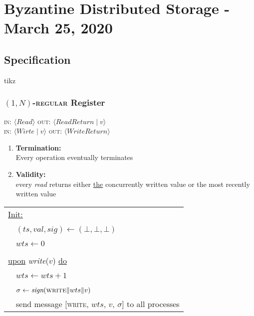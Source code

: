 \documentclass{article}
\begin{document}
	\section{Byzantine Distributed Storage - March 25, 2020}
	\begin{adjustwidth}{2em}{2em}
		\subsection{Specification}
		\begin{adjustwidth}{2em}{2em}
			tikz \\
			\subsubsection{$(1,N)$-\textsc{regular} Register}
			\begin{adjustwidth}{2em}{}
				\textsc{in:} $\langle \textit{Read} \rangle$ \hspace{1.2cm} \textsc{out:} $\langle \textit{ReadReturn} \mid v \rangle$ \\
				\textsc{in:} $\langle \textit{Wirte} \mid v \rangle$ \hspace{1cm}\textsc{out:} $\langle WriteReturn \rangle$ \\
				\begin{enumerate}[-]
					\item \textbf{Termination:} \\
					Every operation eventually terminates
					\item \textbf{Validity:} \\
					every \textit{read} returns either \underline{the} concurrently written value or the most recently written value
				\end{enumerate}
				\begin{center}
					\begin{tabular}{l}
						\underline{Init:} \\
						\ \ $(ts, val, sig) \leftarrow (\bot , \bot , \bot)$ \\
						\ \ $wts \leftarrow 0$ \\
						\\
						\underline{upon} \textit{write}($v$) \underline{do} \\
						\ \ $wts \leftarrow wts + 1$ \\
						\ \ $\sigma \leftarrow \textit{sign}(\textsc{write} \| wts \| v)$ \\
						\ \ send message [\textsc{write}, $wts$, $v$, $\sigma$]  to all processes \\

\end{tabular}
\end{center}
\end{adjustwidth}
\end{adjustwidth}
\end{adjustwidth}
\end{document}
